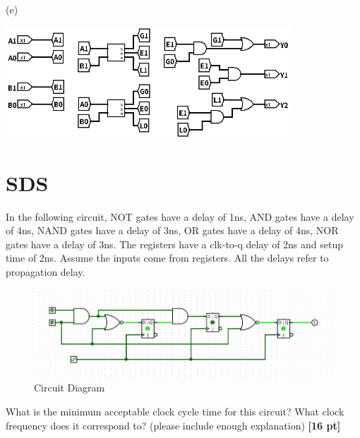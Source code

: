 \documentclass[a4paper]{article}
\begin{document}
\begin{answer}[Question 1]
    \newpage

    (e)\\
    \begin{center}
    \includegraphics[width=0.8\textwidth]{Q1_d.png}
    \end{center}

\end{answer}

\newpage
\section{SDS}
 In the following circuit, NOT gates have a delay of 1ns, AND gates have a delay of 4ns, NAND gates have a delay of 3ns, OR gates have a delay of 4ns, NOR gates have a delay of 3ns. The registers have a clk-to-q delay of 2ns and setup time of 2ns. Assume the inputs
 come from registers. All the delays refer to propagation delay.\\
 
\begin{figure}[hp]
    \centering
    \includegraphics[width=1.0\textwidth]{Q2.png}
    \caption{Circuit Diagram}
    \label{fig:q2}
\end{figure}

What is the minimum acceptable clock cycle time for this circuit? What
 clock frequency does it correspond to? (please include enough explanation) \textbf{[16 pt]}
 
\end{document}
